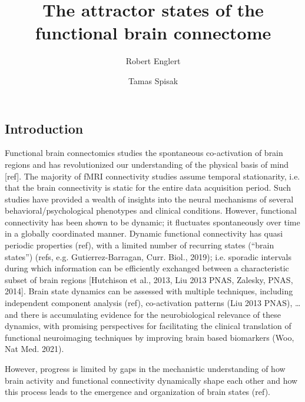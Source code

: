 \documentclass[twocolumn, switch]{article}
\title{The attractor states of the functional brain connectome}
\author[1\thanks{\texttt{robert.englert@uk-essen.de}}]{Robert Englert}
\author[1\thanks{\texttt{tamas.spisak@uk-essen.de}}]{Tamas Spisak}
\affil[1]{University Medicine Essen}
\begin{document}


\subsection{Introduction}\label{Introduction}

Functional brain connectomics studies the spontaneous co-activation of brain regions and has revolutionized our understanding of the physical basis of mind [ref]. The majority of fMRI connectivity studies assume temporal stationarity, i.e. that the brain connectivity is static for the entire data acquisition period. Such studies have provided a wealth of insights into the neural mechanisms of several behavioral/psychological phenotypes and clinical conditions. However, functional connectivity has been shown to be dynamic; it fluctuates spontaneously over time in a globally coordinated manner. Dynamic functional connectivity has quasi periodic properties (ref), with a limited number of recurring states (``brain states'') (refs, e.g. Gutierrez-Barragan, Curr. Biol., 2019); i.e. sporadic intervals during which information can be efficiently exchanged between a characteristic subset of brain regions [Hutchison et al., 2013, Liu 2013 PNAS, Zalesky, PNAS, 2014]. Brain state dynamics can be assessed with multiple techniques, including independent component analysis (ref), co-activation patterns (Liu 2013 PNAS), \dots and there is accumulating evidence for the neurobiological relevance of these dynamics, with promising perspectives for facilitating the clinical translation of functional neuroimaging techniques by improving brain based biomarkers (Woo, Nat Med. 2021).

However, progress is limited by gaps in the mechanistic understanding of how brain activity and functional connectivity dynamically shape each other and how this process leads to the emergence and organization of brain states (ref).
\end{document}
